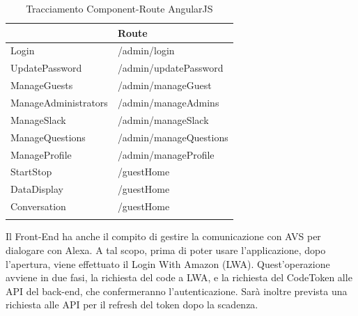 \documentclass[../DefinizioneDiProdotto_v2.0.0.tex]{subfiles}
\begin{document}
\begin{longtable}[c] { >{\centering\arraybackslash}p{5cm} >{\centering\arraybackslash}p{5cm} }
	\toprule
	{\textbf{Componente}} & {\textbf{Route}}       \\
	\midrule
	Login                 & /admin/login           \\
	\addlinespace[0.3em]
	\midrule
	UpdatePassword        & /admin/updatePassword  \\
	\addlinespace[0.3em]
	\midrule
	ManageGuests          & /admin/manageGuest     \\
	\addlinespace[0.3em]
	\midrule
	ManageAdministrators  & /admin/manageAdmins    \\
	\addlinespace[0.3em]
	\midrule
	ManageSlack           & /admin/manageSlack     \\
	\addlinespace[0.3em]
	\midrule
	ManageQuestions       & /admin/manageQuestions \\
	\addlinespace[0.3em]
	\midrule
	ManageProfile         & /admin/manageProfile   \\
	\addlinespace[0.3em]
	\midrule
	StartStop             & /guestHome             \\
	\addlinespace[0.3em]
	\midrule
	DataDisplay           & /guestHome             \\
	\addlinespace[0.3em]
	\midrule
	Conversation          & /guestHome             \\
	\addlinespace[0.3em]
	\bottomrule
	\caption{Tracciamento Component-Route AngularJS}
\end{longtable}

\newpage

Il Front-End ha anche il compito di gestire la comunicazione con AVS per dialogare con Alexa. A tal scopo, prima di poter usare l'applicazione, dopo l'apertura, viene effettuato il Login With Amazon (LWA). Quest'operazione avviene in due fasi, la richiesta del code a LWA, e la richiesta del CodeToken alle API del back-end, che confermeranno l'autenticazione. Sarà inoltre prevista una richiesta alle API per il refresh del token dopo la scadenza.
\end{document}
